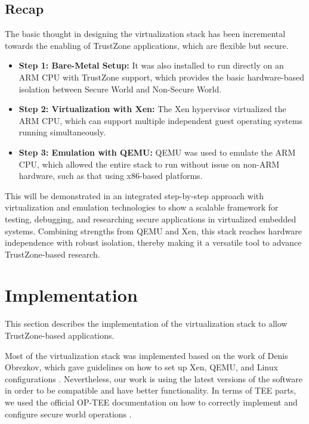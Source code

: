 \documentclass[acmtog]{acmart}
\begin{document}
\subsection{Recap}
The basic thought in designing the virtualization stack has been incremental towards the enabling of TrustZone applications, which are flexible but secure.

\begin{itemize}
    \item \textbf{Step 1: Bare-Metal Setup:} It was also installed to run directly on an ARM CPU with TrustZone support, which provides the basic hardware-based isolation between Secure World and Non-Secure World.
    \item \textbf{Step 2: Virtualization with Xen:} The Xen hypervisor virtualized the ARM CPU, which can support multiple independent guest operating systems running simultaneously.
    \item \textbf{Step 3: Emulation with QEMU:} QEMU was used to emulate the ARM CPU, which allowed the entire stack to run without issue on non-ARM hardware, such as that using x86-based platforms.
\end{itemize}

This will be demonstrated in an integrated step-by-step approach with virtualization and emulation technologies to show a scalable framework for testing, debugging, and researching secure applications in virtualized embedded systems. Combining strengths from QEMU and Xen, this stack reaches hardware independence with robust isolation, thereby making it a versatile tool to advance TrustZone-based research.




\section{Implementation}
This section describes the implementation of the virtualization stack to allow TrustZone-based applications.

Most of the virtualization stack was implemented based on the work of Denis Obrezkov, which gave guidelines on how to set up Xen, QEMU, and Linux configurations \cite{obrezkov2019xen}. Nevertheless, our work is using the latest versions of the software in order to be compatible and have better functionality. In terms of TEE parts, we used the official OP-TEE documentation on how to correctly implement and configure secure world operations \cite{optee_docs}.
\end{document}
